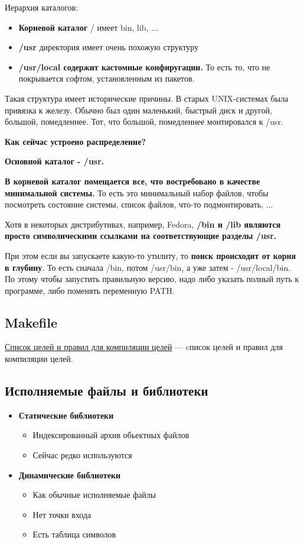 Иерархия каталогов:
\begin{itemize}
	\item \textbf{Корневой каталог} / имеет bin, lib, ...
	\item \textbf{/usr} директория имеет очень похожую структуру
	\item \textbf{/usr/local содержит кастомные конфиругации.} То есть то, что не покрывается софтом, установленным из пакетов.
\end{itemize}

Такая структура имеет исторические причины. В старых UNIX-системах была привязка к железу. Обычно был один маленький, быстрый диск и другой, большой, помедленнее. Тот, что большой, помедленнее монтировался к /usr.

\textbf{Как сейчас устроено распределение?} 

\textbf{Основной каталог - /usr. }

\textbf{В корневой каталог помещается все, что востребовано в качестве минимальной системы.} То есть это минимальный набор файлов, чтобы посмотреть состояние системы, список файлов, что-то подмонтировать, ...

Хотя в некоторых дистрибутивах, например, Fedora, \textbf{/bin и /lib являются просто символическими ссылками на соответствующие разделы /usr.}

При этом если вы запускаете какую-то утилиту, то \textbf{поиск происходит от корня в глубину}. То есть сначала /bin, потом /usr/bin, а уже затем - /usr/local/bin. По этому чтобы запустить правильную версию, надо либо указать полный путь к программе, либо поменять переменную PATH.

\subsection{Makefile}

\begin{Def}
	\underline{Список целей и правил для компиляции целей} --- cписок целей и правил для компиляции целей.
\end{Def}

\subsection{Исполняемые файлы и библиотеки}

\begin{itemize}
	\item \textbf{Статические библиотеки}
		\begin{itemize}
			\item Индексированный архив обьектных файлов
			\item Сейчас редко используются
		\end{itemize}
	\item \textbf{Динамические библиотеки}
		\begin{itemize}
			\item Как обычные исполняемые файлы
			\item Нет точки входа
			\item Есть таблица символов
		\end{itemize}
\end{itemize}


